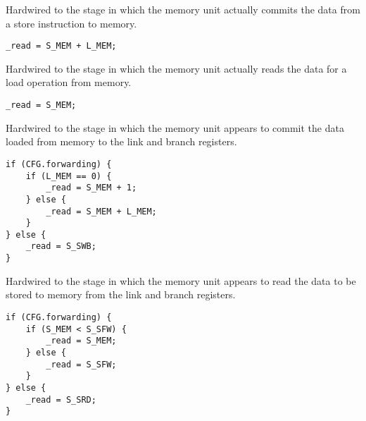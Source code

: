 Hardwired to the stage in which the memory unit actually commits the data from
a store instruction to memory.

\reset{****}
\implementation{}
\begin{lstlisting}
_read = S_MEM + L_MEM;
\end{lstlisting}

Hardwired to the stage in which the memory unit actually reads the data for a
load operation from memory.

\reset{****}
\implementation{}
\begin{lstlisting}
_read = S_MEM;
\end{lstlisting}

Hardwired to the stage in which the memory unit appears to commit the data
loaded from memory to the link and branch registers.

\reset{****}
\implementation{}
\begin{lstlisting}
if (CFG.forwarding) {
    if (L_MEM == 0) {
        _read = S_MEM + 1;
    } else {
        _read = S_MEM + L_MEM;
    }
} else {
    _read = S_SWB;
}
\end{lstlisting}

Hardwired to the stage in which the memory unit appears to read the data to be
stored to memory from the link and branch registers.

\reset{****}
\implementation{}
\begin{lstlisting}
if (CFG.forwarding) {
    if (S_MEM < S_SFW) {
        _read = S_MEM;
    } else {
        _read = S_SFW;
    }
} else {
    _read = S_SRD;
}
\end{lstlisting}

